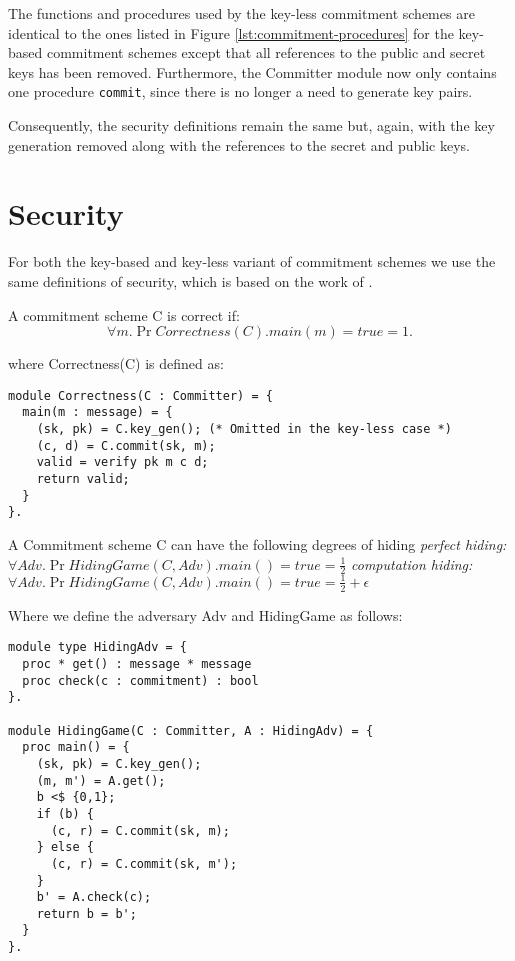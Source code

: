 The functions and procedures used by the key-less commitment schemes are
identical to the ones listed in Figure \ref{lst:commitment-procedures} for the
key-based commitment schemes except that all references to
the public and secret keys has been removed. Furthermore, the Committer module
now only contains one procedure \texttt{commit}, since there is no longer a need
to generate key pairs.

Consequently, the security definitions remain the same but, again, with the key
generation removed along with the references to the secret and public keys.

\section{Security}
\label{sec:commitment:sec}
For both the key-based and key-less variant of commitment schemes we use the
same definitions of security, which is based on the work of
\citet{DBLP:journals/corr/MetereD17}.

\begin{definition}[Correctness]
  \label{def:commitment:correctness}
  A commitment scheme C is correct if:
  \[
    \forall m. \Pr{ Correctness(C).main(m) = true } = 1.
  \]

  where Correctness(C) is defined as:

\begin{lstlisting}
module Correctness(C : Committer) = {
  main(m : message) = {
    (sk, pk) = C.key_gen(); (* Omitted in the key-less case *)
    (c, d) = C.commit(sk, m);
    valid = verify pk m c d;
    return valid;
  }
}.
\end{lstlisting}


\end{definition}

\begin{definition}[Hiding]
  A Commitment scheme C can have the following degrees of hiding
  \label{def:commitment:hiding}
  \textit{perfect hiding:} $\forall Adv. \Pr{HidingGame(C,Adv).main() = true} = \frac{1}{2}$
  \textit{computation hiding:} $\forall Adv. \Pr{HidingGame(C,Adv).main() = true} = \frac{1}{2} + \epsilon$

  Where we define the adversary Adv and HidingGame as follows:
\begin{lstlisting}
module type HidingAdv = {
  proc * get() : message * message
  proc check(c : commitment) : bool
}.

module HidingGame(C : Committer, A : HidingAdv) = {
  proc main() = {
    (sk, pk) = C.key_gen();
    (m, m') = A.get();
    b <$ {0,1};
    if (b) {
      (c, r) = C.commit(sk, m);
    } else {
      (c, r) = C.commit(sk, m');
    }
    b' = A.check(c);
    return b = b';
  }
}.
\end{lstlisting}
\end{definition}

